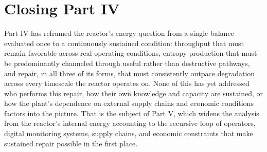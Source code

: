 \section{Closing Part IV}

Part IV has reframed the reactor's energy question from a single balance evaluated once to a continuously sustained condition: throughput that must remain favorable across real operating conditions, entropy production that must be predominantly channeled through useful rather than destructive pathways, and repair, in all three of its forms, that must consistently outpace degradation across every timescale the reactor operates on. None of this has yet addressed who performs this repair, how their own knowledge and capacity are sustained, or how the plant's dependence on external supply chains and economic conditions factors into the picture. That is the subject of Part V, which widens the analysis from the reactor's internal energy accounting to the recursive loop of operators, digital monitoring systems, supply chains, and economic constraints that make sustained repair possible in the first place.
